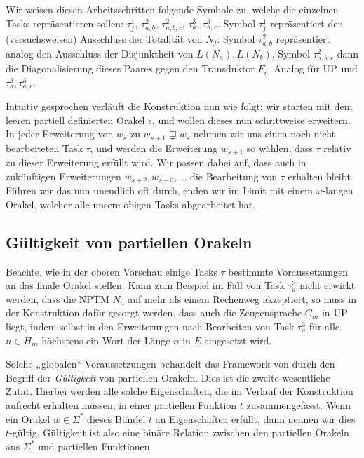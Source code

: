 Wir weisen diesen Arbeitsschritten folgende Symbole zu, welche die einzelnen Tasks repräsentieren sollen: $\tau^1_j$, $\tau^2_{a,b}$, $\tau^2_{a,b,r}$, $\tau^3_a$, $\tau^3_{a,r}$.
Symbol $\tau^1_j$ repräsentiert den (versuchsweisen) Ausschluss der Totalität von $N_j$. Symbol $\tau^2_{a,b}$ repräsentiert analog den Ausschluss der Disjunktheit von $L(N_a), L(N_b)$, Symbol $\tau^2_{a,b,r}$ dann die Diagonalisierung dieses Paares gegen den Transduktor $F_r$. Analog für $\mathrm{UP}$ und $\tau^3_a, \tau^3_{a,r}$.

Intuitiv gesprochen verläuft die Konstruktion nun wie folgt: wir starten mit dem leeren partiell definierten Orakel $\epsilon$, und wollen dieses nun schrittweise erweitern. In jeder Erweiterung von $w_s$ zu $w_{s+1}\sqsupsetneq w_s$ nehmen wir uns einen noch nicht bearbeiteten Task $\tau$, und werden die Erweiterung $w_{s+1}$ so wählen, dass $\tau$ relativ zu dieser Erweiterung erfüllt wird. Wir passen dabei auf, dass auch in zukünftigen Erweiterungen $w_{s+2}, w_{s+3}, \dots$ die Bearbeitung von $\tau$ erhalten bleibt.
Führen wir das nun unendlich oft durch, enden wir im Limit mit einem $\omega$-langen Orakel, welcher alle unsere obigen Tasks abgearbeitet hat.

\subsection*{Gültigkeit von partiellen Orakeln}

Beachte, wie in der oberen Vorschau einige Tasks $\tau$ bestimmte Voraussetzungen an das finale Orakel stellen. Kann zum Beispiel im Fall von Task $\tau^3_a$ nicht erwirkt werden, dass die NPTM $N_a$ auf mehr als einem Rechenweg akzeptiert, so muss in der Konstruktion dafür gesorgt werden, dass auch die Zeugensprache $C_m$ in $\mathrm{UP}$ liegt, indem selbst in den Erweiterungen nach Bearbeiten von Task $\tau^3_a$ für alle $n\in H_m$ höchstens ein Wort der Länge $n$ in $E$ eingesetzt wird.

Solche „globalen“ Voraussetzungen behandelt das Framework von \citeauthor{dose_np-completeness_2019} durch den Begriff der \emph{Gültigkeit} von partiellen Orakeln. Dies ist die zweite wesentliche Zutat.
Hierbei werden alle solche Eigenschaften, die im Verlauf der Konstruktion aufrecht erhalten müssen, in einer partiellen Funktion $t$ zusammengefasst.
Wenn ein Orakel $w\in\Sigma^*$ dieses Bündel $t$ an Eigenschaften erfüllt, dann nennen wir dies $t$-gültig.
Gültigkeit ist also eine binäre Relation zwischen den partiellen Orakeln aus $\Sigma^*$ und partiellen Funktionen.

